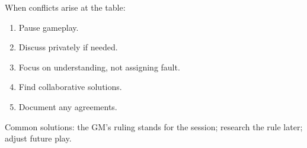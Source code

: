 \begin{tcolorbox}[title=Conflict Resolution, colback=white!97!gray, colframe=black!80!gray,breakable]
When conflicts arise at the table:
\begin{enumerate}
  \item Pause gameplay.
  \item Discuss privately if needed.
  \item Focus on understanding, not assigning fault.
  \item Find collaborative solutions.
  \item Document any agreements.
\end{enumerate}
Common solutions: the GM's ruling stands for the session; research the rule later; adjust future play.
\end{tcolorbox}
